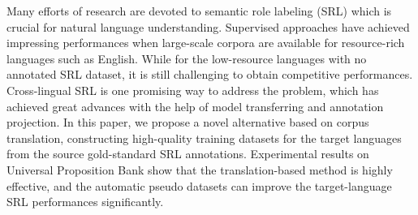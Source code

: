 Many efforts of research are devoted to semantic role labeling (SRL) which is crucial for natural language understanding. Supervised approaches have achieved impressing performances when large-scale corpora are available for resource-rich languages such as English. While for the low-resource languages with no annotated SRL dataset, it is still challenging to obtain competitive performances. Cross-lingual SRL is one promising way to address the problem, which has achieved great advances with the help of model transferring and annotation projection. In this paper, we propose a novel alternative based on corpus translation, constructing high-quality training datasets for the target languages from the source gold-standard SRL annotations. Experimental results on Universal Proposition Bank show that the translation-based method is highly effective, and the automatic pseudo datasets can improve the target-language SRL performances significantly.
